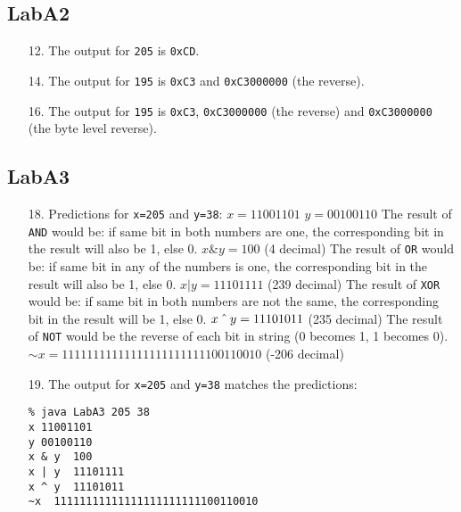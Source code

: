 \documentclass{article}
\begin{document}
\subsection{LabA2}
\begin{enumerate}
\item[12. ] The output for \verb$205$ is \verb$0xCD$.
\item[14. ] The output for \verb$195$ is \verb$0xC3$ and \verb$0xC3000000$ (the reverse).
\item[16. ] The output for \verb$195$ is \verb$0xC3$, \verb$0xC3000000$ (the reverse) and \verb$0xC3000000$ (the byte level reverse).
\end{enumerate}

\subsection{LabA3}
\begin{enumerate}
\item[18. ] Predictions for \verb$x=205$ and \verb$y=38$:\newline\newline
$x = 11001101$ \newline
$y = 00100110$ \newline\newline
The result of \verb$AND$ would be: if same bit in both numbers are one, the corresponding bit in the result will also be 1, else 0. \newline
$x \& y = 100$ (4 decimal) \newline\newline
The result of \verb$OR$ would be: if same bit in any of the numbers is one, the corresponding bit in the result will also be 1, else 0. \newline
$x | y = 11101111$ (239 decimal) \newline\newline
The result of \verb$XOR$ would be: if same bit in both numbers are not the same, the corresponding bit in the result will be 1, else 0. \newline
$x \mathbin{\char`\^} y = 11101011$ (235 decimal) \newline\newline
The result of \verb$NOT$ would be the reverse of each bit in string (0 becomes 1, 1 becomes 0). \newline
$\sim x = 11111111111111111111111100110010$ (-206 decimal)
\pagebreak

\item[19. ] The output for \verb$x=205$ and \verb$y=38$ matches the predictions:\newline
\begin{verbatim}
% java LabA3 205 38
x 11001101
y 00100110
x & y  100
x | y  11101111
x ^ y  11101011
~x  11111111111111111111111100110010
\end{verbatim}
\end{enumerate}
\end{document}

